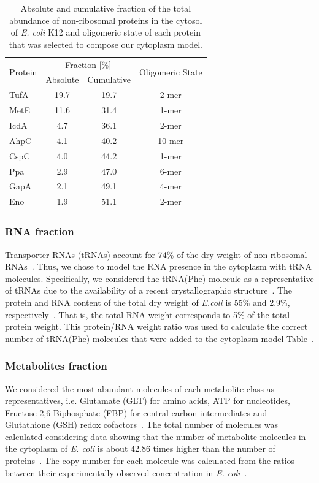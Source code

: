 \documentclass[journal=jacsat,manuscript=article]{achemso}
\newcommand{\tabref}[1]{Table~\plainref{#1}}
\begin{document}
\begin{table}[H]
\centering
\begin{tabular}{ l c c c}
\hline
\multirow{2}{*}{Protein} & 	\multicolumn{2}{c}{Fraction [\%]} & \multirow{2}{*}{Oligomeric State}\\
& Absolute & Cumulative \\ 
\hline
TufA & 19.7 & 19.7 & 2-mer \\
MetE & 11.6 & 31.4 & 1-mer \\
IcdA & 4.7  & 36.1 & 2-mer \\
AhpC & 4.1  & 40.2 & 10-mer \\
CspC & 4.0  & 44.2 & 1-mer \\
Ppa  & 2.9  & 47.0 & 6-mer \\
GapA & 2.1  & 49.1 & 4-mer \\
Eno  & 1.9  & 51.1 & 2-mer \\
\hline
\end{tabular}
\caption{Absolute and cumulative fraction of the total abundance of non-ribosomal proteins in the cytosol of {\em E. coli} K12 and oligomeric state of each protein that was selected to compose our cytoplasm model.}
\label{tbl:protein_fraction}
\end{table}


\subsubsection{RNA fraction}
Transporter RNAs (tRNAs) account for 74\% of the dry weight of non-ribosomal RNAs~\cite{phillips2012}. Thus, we chose to model the RNA presence in the cytoplasm with tRNA molecules. Specifically, we considered the tRNA(Phe) molecule as a representative of tRNAs due to the availability of a recent crystallographic structure~\cite{Byrne2015}.
The protein and RNA content of the total dry weight of \textit{E.coli} is 55\% and 2.9\%, respectively~\cite{phillips2012}. That is, the total RNA weight corresponds to 5\% of the total protein weight. This protein/RNA weight ratio was used to calculate the correct number of tRNA(Phe) molecules that were added to the cytoplasm model \tabref{tbl:soup_components}.

\subsubsection{Metabolites fraction}
We considered the most abundant molecules of each metabolite class as representatives, i.e. Glutamate (GLT) for amino acids, ATP for nucleotides, Fructose-2,6-Biphosphate (FBP) for central carbon intermediates and Glutathione (GSH) redox cofactors~\cite{Bennett2009}. The total number of molecules was calculated considering data showing that the number of metabolite molecules in the cytoplasm of \textit{E. coli} is about 42.86 times higher than the number of proteins~\cite{Bennett2009}. The copy number for each molecule was calculated from the ratios between their experimentally observed concentration in {\em E. coli}~\cite{Bennett2009}.
\end{document}
